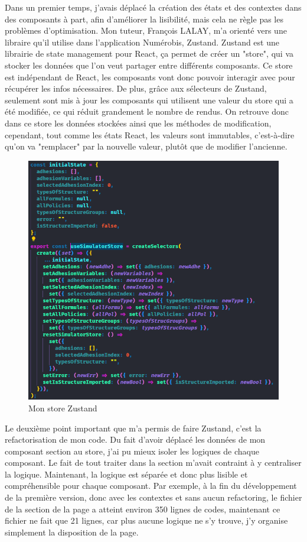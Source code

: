 \documentclass[a4paper,12pt]{report}
\begin{document}
Dans un premier temps, j'avais déplacé la création des états et des contextes dans des composants à part, afin d'améliorer la lisibilité, mais cela ne règle pas les problèmes d'optimisation. Mon tuteur, François LALAY, m'a orienté vers une libraire qu'il utilise dans l'application Numérobis, Zustand. Zustand est une librairie de state management pour React, ça permet de créer un "store", qui va stocker les données que l'on veut partager entre différents composants. Ce store est indépendant de React, les composants vont donc pouvoir interagir avec pour récupérer les infos nécessaires. De plus, grâce aux sélecteurs de Zustand, seulement sont mis à jour les composants qui utilisent une valeur du store qui a été modifiée, ce qui réduit grandement le nombre de rendus. On retrouve donc dans ce store les données stockées ainsi que les méthodes de modification, cependant, tout comme les états React, les valeurs sont immutables, c'est-à-dire qu'on va "remplacer" par la nouvelle valeur, plutôt que de modifier l'ancienne.

\begin{figure}[H]
    \centering
    \includegraphics[scale=0.4]{storeZustand.png}
    \caption{Mon store Zustand}
    \label{fig:store-zustand}
\end{figure}

Le deuxième point important que m'a permis de faire Zustand, c'est la refactorisation de mon code. Du fait d'avoir déplacé les données de mon composant section au store, j'ai pu mieux isoler les logiques de chaque composant. Le fait de tout traiter dans la section m'avait contraint à y centraliser la logique. Maintenant, la logique est séparée et donc plus lisible et compréhensible pour chaque composant. Par exemple, à la fin du développement de la première version, donc avec les contextes et sans aucun refactoring, le fichier de la section de la page a atteint environ 350 lignes de codes, maintenant ce fichier ne fait que 21 lignes, car plus aucune logique ne s'y trouve, j'y organise simplement la disposition de la page.
\end{document}

